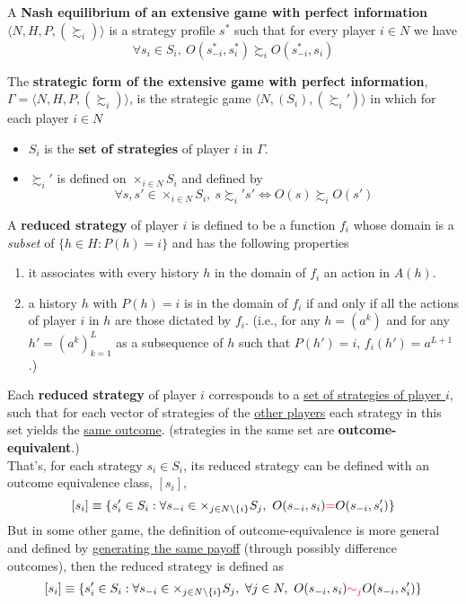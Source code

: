 \documentclass[11pt]{article}
\begin{document}
			\begin{definition}[93.1] A \textbf{Nash equilibrium of an extensive game with perfect information} $\langle N, H, P, (\succsim_i) \rangle$ is a strategy profile $s^*$ such that for every player $i \in N$ we have
			\[
				\forall s_i \in S_i,\ O(s_{-i}^*, s_i^*) \succsim_i O(s_{-i}^*, s_i)
			\]
			\end{definition}
			
			\begin{definition}[94.1] The \textbf{strategic form of the extensive game with perfect information}, $\Gamma=\langle N, H, P, (\succsim_i) \rangle$, is the strategic game $\langle N, (S_i), (\succsim_i') \rangle$ in which for each player $i \in N$
				\begin{itemize}
					\item $S_i$ is the \textbf{set of strategies} of player $i$ in $\Gamma$.
					\item $\succsim_i'$ is defined on $\times_{i \in N}S_i$ and defined by
					\[
						\forall s, s' \in \times_{i \in N}S_i,\ s \succsim_i' s' \iff O(s) \succsim_i O(s')
					\]
				\end{itemize}
			\end{definition}
			
			\begin{definition}[pg.94]
				A \textbf{reduced strategy} of player $i$ is defined to be a function $f_i$ whose domain is a \emph{subset} of $\{h \in H: P(h) = i\}$ and has the following properties
				\begin{enumerate}
					\item it associates with every history $h$ in the domain of $f_i$ an action in $A(h)$.
					\item a history $h$ with $P(h) = i$ is in the domain of $f_i$ if and only if all the actions of player $i$ in $h$ are those dictated by $f_i$. (i.e., for any $h = (a^k)$ and for any $h' = (a^k)_{k=1}^L$ as a subsequence of $h$ such that $P(h')=i$, $f_i(h') = a^{L+1}$.)
				\end{enumerate}
			\end{definition}
			\begin{remark}[pg.94]
				Each \textbf{reduced strategy} of player $i$ corresponds to a \ul{set of strategies of player $i$}, such that for each vector of strategies of the \ul{other players} each strategy in this set yields the \ul{same outcome}. (strategies in the same set are \textbf{outcome-equivalent}.) \\
				That's, for each strategy $s_i \in S_i$, its reduced strategy can be defined with an outcome equivalence class, $[s_i]$,
				\[
					[s_i] \equiv \{
					s'_i \in S_i: \forall s_{-i} \in \times_{j \in N \backslash \{i\}} S_j,\ O(s_{-i}, s_i) \textcolor{red}{=} O(s_{-i}, s_i')
					\}
				\]
				But in some other game, the definition of outcome-equivalence is more general and defined by \ul{generating the same payoff} (through possibly difference outcomes), then the reduced strategy is defined as
				\[
					[s_i] \equiv \{
					s'_i \in S_i: \forall s_{-i} \in \times_{j \in N \backslash \{i\}} S_j,\ \forall j \in N,\ O(s_{-i}, s_i) \textcolor{red}{\sim_j} O(s_{-i}, s_i')
					\}
				\]
			\end{remark}
			
\end{document}
